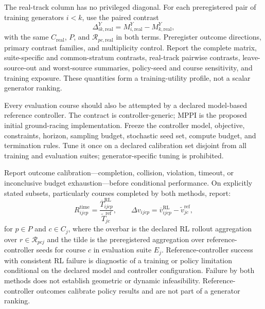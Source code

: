The real-track column has no privileged diagonal. For each preregistered pair of
training generators $i<k$, use the paired contrast
\begin{equation}
  \Delta^Y_{ik,\mathrm{real}}
  =M^Y_{i,\mathrm{real}}-M^Y_{k,\mathrm{real}},
  \label{eq:real-track-transfer-gap}
\end{equation}
with the same $C_{\mathrm{real}}$, $P$, and
$\mathcal{R}_{pc,\mathrm{real}}$ in both terms. Preregister outcome directions,
primary contrast families, and multiplicity control. Report the complete matrix,
suite-specific and common-stratum contrasts, real-track pairwise contrasts,
leave-source-out and worst-source summaries, policy-seed and course sensitivity, and
training exposure. These quantities form a training-utility profile, not a scalar
generator ranking.

Every evaluation course should also be attempted by a declared model-based reference
controller. The contract is controller-generic; MPPI is the proposed initial
ground-racing implementation. Freeze the controller model, objective, constraints,
horizon, sampling budget, stochastic seed set, compute budget, and termination rules.
Tune it once on a declared calibration set disjoint from all training and evaluation
suites; generator-specific tuning is prohibited.

Report outcome calibration---completion, collision, violation, timeout, or
inconclusive budget exhaustion---before conditional performance. On explicitly stated
subsets, particularly courses completed by both methods, report:
\begin{equation}
  R^{\mathrm{time}}_{ijcp}
  =\frac{\overline{T}^{\mathrm{RL}}_{ijcp}}
  {\widetilde{T}^{\mathrm{ref}}_{jc}},
  \qquad
  \Delta v_{ijcp}
  =\overline{v}^{\mathrm{RL}}_{ijcp}
  -\widetilde{v}^{\mathrm{ref}}_{jc},
  \label{eq:reference-controller-gap}
\end{equation}
for $p\in P$ and $c\in C_j$, where the overbar is the declared RL rollout aggregation
over $r\in\mathcal{R}_{pcj}$ and the tilde is the preregistered aggregation over
reference-controller seeds for course $c$ in evaluation suite $E_j$.
Reference-controller
success with consistent RL failure is diagnostic of a training or policy limitation
conditional on the declared model and controller configuration. Failure by both
methods does not establish geometric or dynamic infeasibility. Reference-controller
outcomes calibrate policy results and are not part of a generator ranking.

